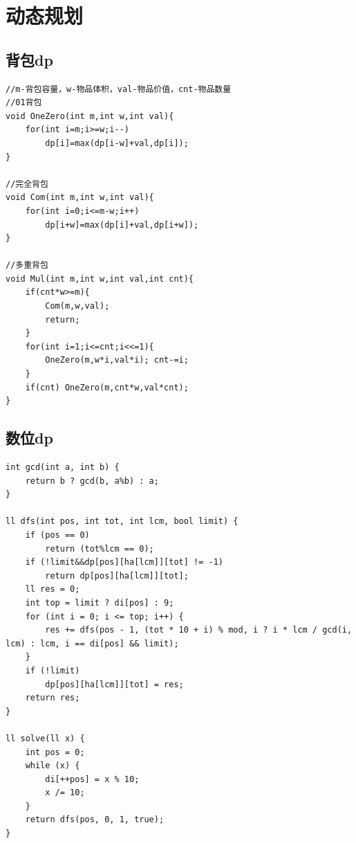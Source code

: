 \documentclass[twoside]{article}
\begin{document}
\clearpage\section{动态规划}
\subsection{背包dp}
\begin{lstlisting}
//m-背包容量，w-物品体积，val-物品价值，cnt-物品数量
//01背包
void OneZero(int m,int w,int val){
    for(int i=m;i>=w;i--)
        dp[i]=max(dp[i-w]+val,dp[i]);
}

//完全背包
void Com(int m,int w,int val){
    for(int i=0;i<=m-w;i++)
        dp[i+w]=max(dp[i]+val,dp[i+w]);
}

//多重背包
void Mul(int m,int w,int val,int cnt){
    if(cnt*w>=m){
        Com(m,w,val);
        return;
    }
    for(int i=1;i<=cnt;i<<=1){
        OneZero(m,w*i,val*i); cnt-=i;
    }
    if(cnt) OneZero(m,cnt*w,val*cnt);
}\end{lstlisting}
\subsection{数位dp}
\begin{lstlisting}
int gcd(int a, int b) {
	return b ? gcd(b, a%b) : a;
}

ll dfs(int pos, int tot, int lcm, bool limit) {
	if (pos == 0)
		return (tot%lcm == 0);
	if (!limit&&dp[pos][ha[lcm]][tot] != -1)
		return dp[pos][ha[lcm]][tot];
	ll res = 0;
	int top = limit ? di[pos] : 9;
	for (int i = 0; i <= top; i++) {
		res += dfs(pos - 1, (tot * 10 + i) % mod, i ? i * lcm / gcd(i, lcm) : lcm, i == di[pos] && limit);
	}
	if (!limit)
		dp[pos][ha[lcm]][tot] = res;
	return res;
}

ll solve(ll x) {
	int pos = 0;
	while (x) {
		di[++pos] = x % 10;
		x /= 10;
	}
	return dfs(pos, 0, 1, true);
}\end{lstlisting}
\end{document}
